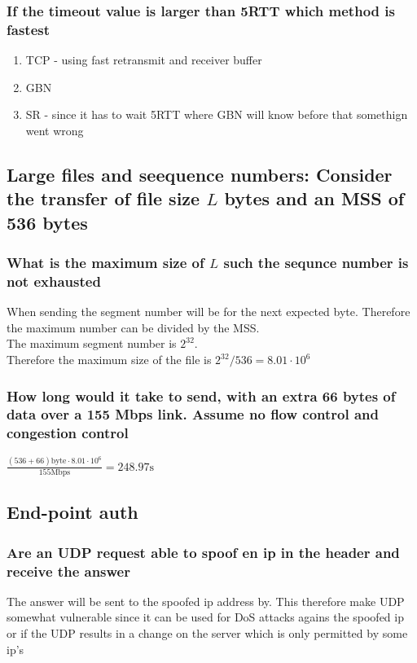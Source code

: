 \documentclass[12pt, a4paper]{article}
\begin{document}
			\subsubsection{If the timeout value is larger than 5RTT which method is fastest}
				\begin{enumerate}
					\item TCP - using fast retransmit and receiver buffer
					\item GBN
					\item SR - since it has to wait 5RTT where GBN will know before that somethign went wrong
				\end{enumerate}
		\subsection{Large files and seequence numbers: Consider the transfer of file size $L$ bytes and an MSS of 536 bytes}
			\subsubsection{What is the maximum size of $L$ such the sequnce number is not exhausted}
				When sending the segment number will be for the next expected byte. Therefore the maximum number can be divided by the MSS.\\
				The maximum segment number is $2^{32}$.\\
				Therefore the maximum size of the file is $2^{32}/536=8.01\cdot 10^6$
			\subsubsection{How long would it take to send, with an extra 66 bytes of data over a 155 Mbps link. Assume no flow control and congestion control}
				$\frac{(536+66)\text{byte}\cdot 8.01\cdot 10^6}{155\text{Mbps}}=248.97\text{s}$
		\subsection{End-point auth}
			\subsubsection{Are an UDP request able to spoof en ip in the header and receive the answer}
				The answer will be sent to the spoofed ip address by. This therefore make UDP somewhat vulnerable since it can be used for DoS attacks agains the spoofed ip or if the UDP results in a change on the server which is only permitted by some ip's
\end{document}
